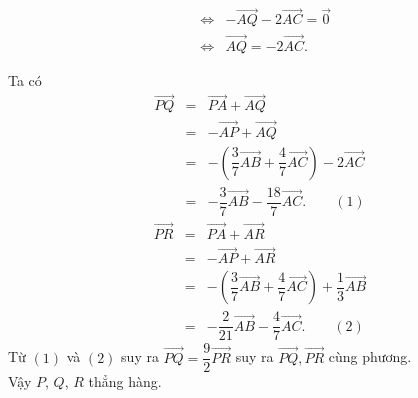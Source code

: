 \begin{bt}
{\begin{itemize}
\begin{eqnarray*}
		\\
		&\Leftrightarrow&
		-\overrightarrow{AQ}-2\overrightarrow{AC}=\overrightarrow{0}
		\\
		&\Leftrightarrow&
		\overrightarrow{AQ}=-2\overrightarrow{AC}.
	\end{eqnarray*}
	\end{itemize}	
	Ta có 
	\allowdisplaybreaks
	\begin{eqnarray*}
		\overrightarrow{PQ}&=&\overrightarrow{PA}+\overrightarrow{AQ}
		\\
		&=&-\overrightarrow{AP}+\overrightarrow{AQ}
		\\
		&=&-\left(\dfrac{3}{7}\overrightarrow{AB}+\dfrac{4}{7}\overrightarrow{AC}\right)-2\overrightarrow{AC}
		\\
		&=&-\dfrac{3}{7}\overrightarrow{AB}-\dfrac{18}{7}\overrightarrow{AC}. \qquad(1)
	\end{eqnarray*}
	\allowdisplaybreaks
	\begin{eqnarray*}
		\overrightarrow{PR}&=&\overrightarrow{PA}+\overrightarrow{AR}
		\\
		&=&-\overrightarrow{AP}+\overrightarrow{AR}
		\\
		&=&-\left(\dfrac{3}{7}\overrightarrow{AB}+\dfrac{4}{7}\overrightarrow{AC}\right)+\dfrac{1}{3}\overrightarrow{AB}
		\\
		&=&-\dfrac{2}{21}\overrightarrow{AB}-\dfrac{4}{7}\overrightarrow{AC}. \qquad(2)
	\end{eqnarray*}
	Từ $(1)$ và $(2)$ suy ra $\overrightarrow{PQ}=\dfrac{9}{2}\overrightarrow{PR}$ suy ra $\overrightarrow{PQ}, \overrightarrow{PR}$ cùng phương.\\
	Vậy $P$, $Q$, $R $ thẳng hàng.
	}
\end{bt}

